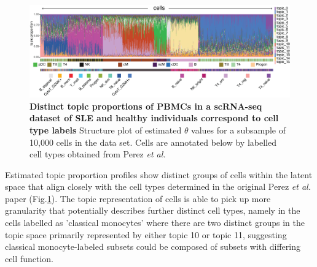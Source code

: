 \begin{figure}
    \centering
    \includegraphics[width=\textwidth]{Figures/struct_plt.png}
    \caption{\textbf{Distinct topic proportions of PBMCs in a scRNA-seq dataset of SLE and healthy individuals correspond to cell type labels} Structure plot of estimated $\theta$ values for a subsample of 10,000 cells in the data set. Cells are annotated below by labelled cell types obtained from Perez \textit{et al.} \cite{sledata}}
    \label{fig:sle_struct}
\end{figure}

Estimated topic proportion profiles show distinct groups of cells within the latent space that align closely with the cell types determined in the original Perez \textit{et al.} paper \cite{sledata} (Fig.\ref{fig:sle_struct}). The topic representation of cells is able to pick up more granularity that potentially describes further distinct cell types, namely in the cells labelled as 'classical monocytes' where there are two distinct groups in the topic space primarily represented by either topic 10 or topic 11, suggesting classical monocyte-labeled subsets could be composed of subsets with differing cell function. 

